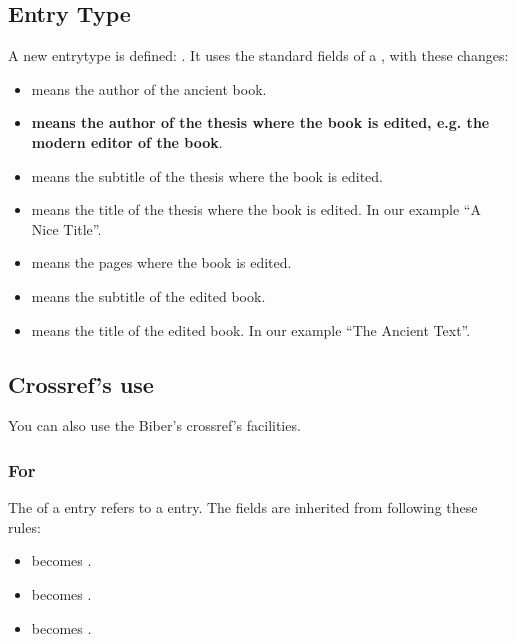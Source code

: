 \documentclass{ltxdockit}[2011/03/25]
\begin{document}
\subsection{ Entry Type}

A new entrytype is defined: . It uses the standard fields of a , with these changes:

\begin{itemize}
	\item {} means the author of the ancient book.
	\item \textbf{ means the author of the thesis where the book is edited, e.g. the modern editor of the book}.
	\item {} means the subtitle of the thesis where the book is edited.
	\item {} means the title of the thesis where the book is edited. In our example \enquote{A Nice Title}.
	\item {} means the pages where the book is edited.
	\item {} means the subtitle of the edited book.
	\item {} means the title of the edited book. In our example \enquote{The Ancient Text}.


\end{itemize}

\subsection{Crossref's use}

You can also use the Biber's crossref's facilities.

\subsubsection{For }
The  of a  entry refers to a  entry. The fields are inherited from  following these rules:

\begin{itemize}
	\item {} becomes .
	\item {} becomes .
	\item {} becomes .

\end{itemize}
\end{document}
